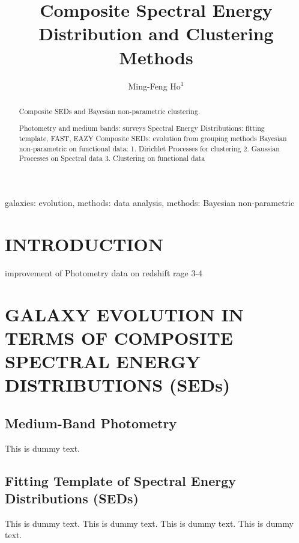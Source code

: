 \documentclass{ar-1col}
\begin{document}

\title{Composite Spectral Energy Distribution and Clustering Methods}

\author{Ming-Feng Ho$^1$
}

\begin{abstract}
Composite SEDs and Bayesian non-parametric clustering.

Photometry and medium bands: surveys
Spectral Energy Distributions: fitting template, FAST, EAZY
Composite SEDs: evolution from grouping methods
Bayesian non-parametric on functional data:
1. Dirichlet Processes for clustering
2. Gaussian Processes on Spectral data
3. Clustering on functional data 

\end{abstract}

\begin{keywords}
galaxies: evolution, methods: data analysis, methods: Bayesian non-parametric
\end{keywords}
\maketitle

\tableofcontents


\section{INTRODUCTION}
improvement of Photometry data on redshift rage 3-4


\section{GALAXY EVOLUTION IN TERMS OF COMPOSITE SPECTRAL ENERGY DISTRIBUTIONS (SEDs)}

\subsection{Medium-Band Photometry}
This is dummy text. 

\subsection{Fitting Template of Spectral Energy Distributions (SEDs)}
This is dummy text. This is dummy text. This is dummy text. This is dummy text.
\end{document}
